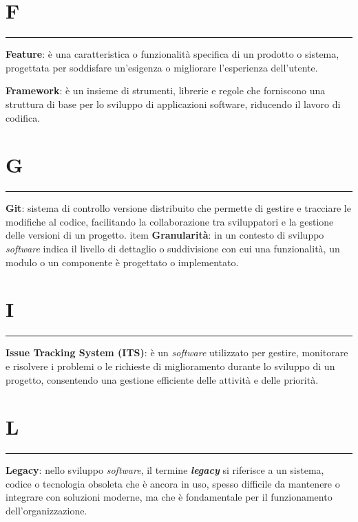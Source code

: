 \section*{F}
{\color{lightgray}\rule{\textwidth}{0.4pt}} %
\begin{glossaryitemize}
    \item \textbf{Feature}: è una caratteristica o funzionalità specifica di un prodotto o sistema, progettata per soddisfare un'esigenza o migliorare l'esperienza dell'utente.
    \item \textbf{Framework}: è un insieme di strumenti, librerie e regole che forniscono una struttura di base per lo sviluppo di applicazioni software, riducendo il lavoro di codifica.
\end{glossaryitemize}

\section*{G}
{\color{lightgray}\rule{\textwidth}{0.4pt}} %
\begin{glossaryitemize}
    \item \textbf{Git}: sistema di controllo versione distribuito che permette di gestire e tracciare le modifiche al codice, facilitando la collaborazione tra sviluppatori e la gestione delle versioni di un progetto.
    item \textbf{Granularità}: in un contesto di sviluppo \textit{software} indica il livello di dettaglio o suddivisione con cui una funzionalità, un modulo o un componente è progettato o implementato.
\end{glossaryitemize}

\section*{I}
{\color{lightgray}\rule{\textwidth}{0.4pt}} %
\begin{glossaryitemize}
    \item \textbf{Issue Tracking System (ITS)}: è un \textit{software} utilizzato per gestire, monitorare e risolvere i problemi o le richieste di miglioramento durante lo sviluppo di un progetto, consentendo una gestione efficiente delle attività e delle priorità.
\end{glossaryitemize}

\section*{L}
{\color{lightgray}\rule{\textwidth}{0.4pt}} %
\begin{glossaryitemize}
    \item \textbf{Legacy}: nello sviluppo \textit{software}, il termine \textit{\textbf{legacy}} si riferisce a un sistema, codice o tecnologia obsoleta che è ancora in uso, spesso difficile da mantenere o integrare con soluzioni moderne, ma che è fondamentale per il funzionamento dell'organizzazione.
\end{glossaryitemize}

